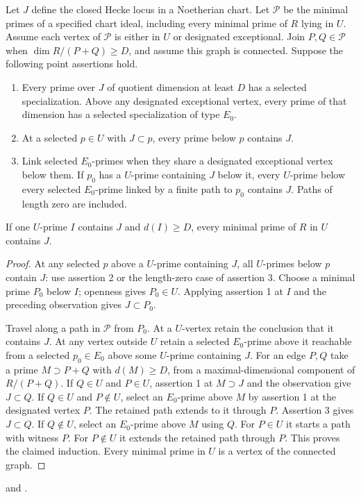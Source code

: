 \begin{lemma}\label{cprop:local}
Let \(J\) define the closed Hecke locus in a Noetherian chart.
Let \(\mathcal P\) be the minimal primes of a specified chart ideal,
including every minimal prime of \(R\) lying in \(U\). Assume each
vertex of \(\mathcal P\) is either in \(U\) or designated exceptional.
Join \(P,Q\in\mathcal P\) when \(\dim R/(P+Q)\ge D\), and assume
this graph is connected. Suppose the following point assertions hold.
\begin{enumerate}
\item Every prime over \(J\) of quotient dimension at least \(D\)
has a selected specialization. Above any designated exceptional
vertex, every prime of that dimension has a selected specialization
of type \(E_0\).
\item At a selected \(p\in U\) with \(J\subset p\), every prime
below \(p\) contains \(J\).
\item Link selected \(E_0\)-primes when they share a designated
exceptional vertex below them. If \(p_0\) has a \(U\)-prime
containing \(J\) below it, every \(U\)-prime below every selected
\(E_0\)-prime linked by a finite path to \(p_0\) contains \(J\).
Paths of length zero are included.
\end{enumerate}
If one \(U\)-prime \(I\) contains \(J\) and \(d(I)\ge D\), every
minimal prime of \(R\) in \(U\) contains \(J\).
\end{lemma}
\begin{proof}
At any selected \(p\) above a \(U\)-prime containing \(J\), all
\(U\)-primes below \(p\) contain \(J\): use assertion 2 or the
length-zero case of assertion 3. Choose a minimal prime \(P_0\)
below \(I\); openness gives \(P_0\in U\). Applying assertion 1
at \(I\) and the preceding observation gives \(J\subset P_0\).

Travel along a path in \(\mathcal P\) from \(P_0\). At a \(U\)-vertex
retain the conclusion that it contains \(J\). At any vertex outside
\(U\) retain a selected \(E_0\)-prime above it reachable from a
selected \(p_0\in E_0\) above some \(U\)-prime containing \(J\).
For an edge \(P,Q\) take a prime \(M\supset P+Q\) with \(d(M)\ge D\),
from a maximal-dimensional component of \(R/(P+Q)\).
If \(Q\in U\) and \(P\in U\), assertion 1 at \(M\supset J\)
and the observation give \(J\subset Q\).
If \(Q\in U\) and \(P\notin U\), select an \(E_0\)-prime above
\(M\) by assertion 1 at the designated vertex \(P\). The retained
path extends to it through \(P\). Assertion 3 gives \(J\subset Q\).
If \(Q\notin U\), select an \(E_0\)-prime above \(M\) using \(Q\).
For \(P\in U\) it starts a path with witness \(P\). For \(P\notin U\)
it extends the retained path through \(P\). This proves the claimed
induction. Every minimal prime in \(U\) is a vertex of the connected graph.
\end{proof}
and .

